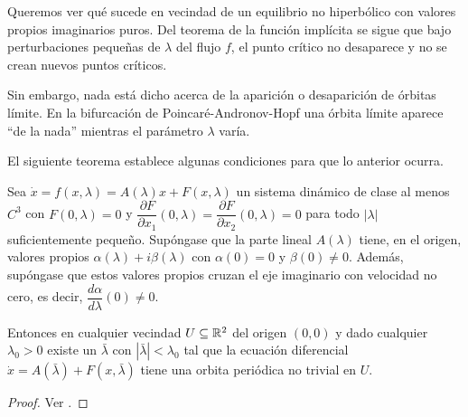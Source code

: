 Queremos ver qué sucede en vecindad de un equilibrio no hiperbólico con valores propios imaginarios puros. Del teorema de la función implícita se sigue que bajo perturbaciones pequeñas de $\lambda$ del flujo $f$, el punto crítico no desaparece y no se crean nuevos puntos críticos.

Sin embargo, nada está dicho acerca de la aparición o desaparición de órbitas límite. En la bifurcación de Poincaré-Andronov-Hopf una órbita límite aparece ``de la nada'' mientras el parámetro $\lambda$ varía.

El siguiente teorema establece algunas condiciones para que lo anterior ocurra.

\begin{theorem} \label{teo:poincare-andronov-hopf} Sea $\dot{x} = f(x,\lambda) = A(\lambda)x + F(x,\lambda)$ un sistema dinámico de clase al menos $C^3$ con $F(0,\lambda) = 0$ y $\dfrac{\partial F}{\partial x_1}(0, \lambda) = \dfrac{\partial F}{\partial x_2}(0, \lambda) = 0$ para todo $|\lambda|$ suficientemente pequeño. Supóngase que la parte lineal $A(\lambda)$ tiene, en el origen, valores propios $\alpha(\lambda) + i\beta(\lambda)$ con $\alpha(0) = 0$ y $\beta(0) \neq 0$.
Además, supóngase que estos valores propios cruzan el eje imaginario con velocidad no cero, es decir, $\dfrac{d\alpha}{d\lambda}(0) \neq 0$.

Entonces en cualquier vecindad $U \subseteq {\ensuremath{\mathbb{R}}}^2$ del origen $(0,0)$ y dado cualquier $\lambda_0 > 0$ existe un $\bar{\lambda}$ con $|\bar{\lambda}| < \lambda_0$ tal que la ecuación diferencial $\dot{x} = A(\bar{\lambda}) + F(x, \bar{\lambda})$ tiene una orbita periódica no trivial en $U$.
\begin{proof}
Ver \cite[p.~344]{dynandbif}.
\end{proof}
\end{theorem}

